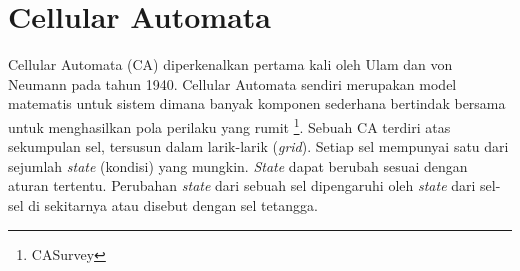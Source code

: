 


\section{Cellular Automata}
\label{sec:cellularautomata}

Cellular Automata (CA) diperkenalkan pertama kali oleh Ulam dan von Neumann pada tahun 1940. Cellular Automata sendiri merupakan model matematis untuk sistem dimana banyak komponen sederhana bertindak bersama untuk menghasilkan pola perilaku yang rumit \footnote{CASurvey}. Sebuah CA terdiri atas sekumpulan sel, tersusun dalam larik-larik (\textit{grid}). Setiap sel mempunyai satu dari sejumlah \textit{state} (kondisi) yang mungkin. \textit{State} dapat berubah sesuai dengan aturan tertentu. Perubahan \textit{state} dari sebuah sel dipengaruhi oleh \textit{state} dari sel-sel di sekitarnya atau disebut dengan sel tetangga.

